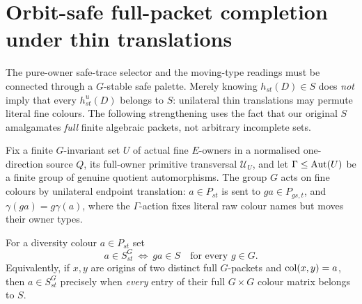 \section{Orbit-safe full-packet completion under thin translations}
\label{sec:orbit-safe-packets}

The pure-owner safe-trace selector and the moving-type readings
must be connected through a $G$-stable safe palette.  Merely
knowing $h_{st}(D)\in S$ does \emph{not} imply that every
$h^u_{st}(D)$ belongs to $S$: unilateral thin translations
may permute literal fine colours.  The following strengthening
uses the fact that our original $S$ amalgamates \emph{full}
finite algebraic packets, not arbitrary incomplete sets.

Fix a finite $G$-invariant set $U$ of actual fine $E$-owners
in a normalised one-direction source $Q$, its full-owner
primitive transversal $\mathcal U_U$, and let $\Gamma\le\operatorname{Aut}(U)$
be a finite group of genuine quotient automorphisms.  The group
$G$ acts on fine colours by unilateral endpoint translation:
$a\in P_{st}$ is sent to $ga\in P_{gs,t}$, and
$\gamma(ga)=g\gamma(a)$, where the $\Gamma$-action fixes
literal raw colour names but moves their owner types.

\begin{definition}
\label{def:orbit-safe}
For a diversity colour $a\in P_{st}$ set
\[
  a\in S^{G}_{st}\ \Longleftrightarrow\
           ga\in S\quad\text{for every }g\in G.
\]
Equivalently, if $x,y$ are origins of two distinct full
$G$-packets and $\operatorname{col}(x,y)=a$, then $a\in S^G_{st}$
precisely when \emph{every} entry of their full
$G\times G$ colour matrix belongs to $S$.
\end{definition}

